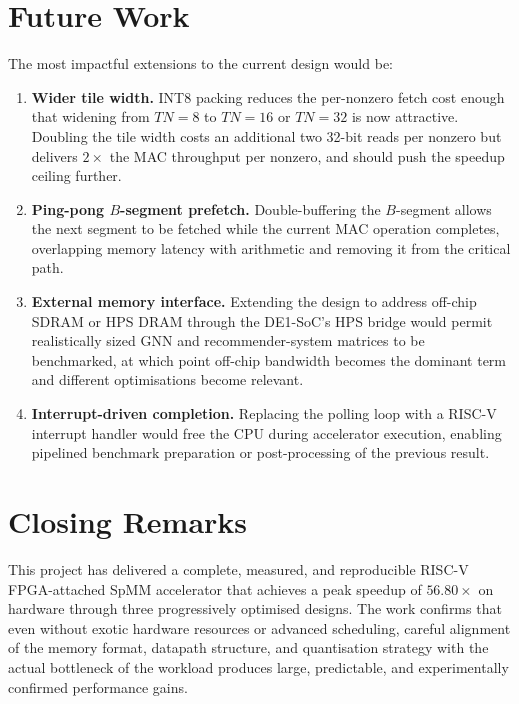 \section{Future Work}

The most impactful extensions to the current design would be:

\begin{enumerate}
  \item \textbf{Wider tile width.} INT8 packing reduces the per-nonzero fetch
        cost enough that widening from $TN = 8$ to $TN = 16$ or $TN = 32$ is
        now attractive. Doubling the tile width costs an additional two
        32-bit reads per nonzero but delivers $2\times$ the MAC throughput
        per nonzero, and should push the speedup ceiling further.

  \item \textbf{Ping-pong $B$-segment prefetch.} Double-buffering the
        $B$-segment allows the next segment to be fetched while the current
        MAC operation completes, overlapping memory latency with arithmetic
        and removing it from the critical path.

  \item \textbf{External memory interface.} Extending the design to address
        off-chip SDRAM or HPS DRAM through the DE1-SoC's HPS bridge would
        permit realistically sized GNN and recommender-system matrices to
        be benchmarked, at which point off-chip bandwidth becomes the
        dominant term and different optimisations become relevant.

  \item \textbf{Interrupt-driven completion.} Replacing the polling loop
        with a RISC-V interrupt handler would free the CPU during
        accelerator execution, enabling pipelined benchmark preparation or
        post-processing of the previous result.

\end{enumerate}

\section{Closing Remarks}

This project has delivered a complete, measured, and reproducible RISC-V
FPGA-attached SpMM accelerator that achieves a peak speedup of $56.80\times$
on hardware through three progressively optimised designs. The work confirms
that even without exotic hardware resources or advanced scheduling, careful
alignment of the memory format, datapath structure, and quantisation strategy
with the actual bottleneck of the workload produces large, predictable, and
experimentally confirmed performance gains.
